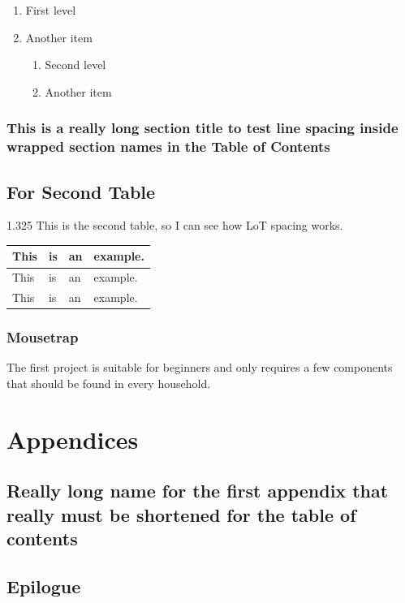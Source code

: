 \documentclass[
    fontsize=11,
    paper=letter,
    twoside=true,  %
    open=right,
    chapterprefix=true,  %
    appendixprefix=true,  %
    numbers=noendperiod,  %
    toc=flat,  %
    usegeometry=true  %
  ]{scrreprt}
\begin{document}
\begin{enumerate}
    \item First level
    \item Another item
    \begin{enumerate}
        \item Second level
        \item Another item
    \end{enumerate}
\end{enumerate}

\section{This is a really long section title to test line spacing inside wrapped section names in the Table of Contents}

\blinddocument

\chapter{For Second Table}
\begin{spacing}{1.325} %
This is the second table, so I can see how LoT spacing works.
\end{spacing}

\begin{table}
    \centering
    \begin{tabular}{llll}
        This & is & an & example.\\ \hline
        This & is & an & example.\\
        This & is & an & example.
    \end{tabular}
\end{table}

\section{Mousetrap}
The first project is suitable for beginners and only requires a few components that should be found in every household.

\blinddocument

\part*{Appendices}
\appendix
\chapter[Short Name]{Really long name for the first appendix that really must be shortened for the table of contents}
\blindtext[1]

\chapter{Epilogue}
\blindtext[1]
\end{document}
